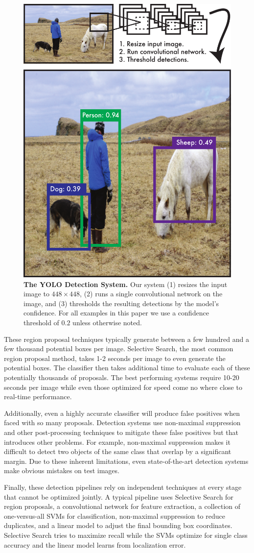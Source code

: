 \documentclass{article} %
\begin{document}
\begin{figure}[t]
\begin{center}
        \includegraphics[width=.4\linewidth]{system}
\end{center}
   \caption{\textbf{The YOLO Detection System.} Our system (1) resizes the input image to $448 \times 448$, (2) runs a single convolutional network on the image, and (3) thresholds the resulting detections by the model's confidence. For all examples in this paper we use a confidence threshold of $0.2$ unless otherwise noted.}
\label{system}
\end{figure}

These region proposal techniques typically generate between a few hundred and a few thousand potential boxes per image. Selective Search, the most common region proposal method, takes 1-2 seconds per image to even generate the potential boxes. The classifier then takes additional time to evaluate each of these potentially thousands of proposals. The best performing systems require 10-20 seconds per image while even those optimized for speed come no where close to real-time performance.

Additionally, even a highly accurate classifier will produce false positives when faced with so many proposals. Detection systems use non-maximal suppression and other post-processing techniques to mitigate these false positives but that introduces other problems. For example, non-maximal suppression makes it difficult to detect two objects of the same class that overlap by a significant margin. Due to these inherent limitations, even state-of-the-art detection systems make obvious mistakes on test images.

Finally, these detection pipelines rely on independent techniques at every stage that cannot be optimized jointly. A typical pipeline uses Selective Search for region proposals, a convolutional network for feature extraction, a collection of one-versus-all SVMs for classification, non-maximal suppression to reduce duplicates, and a linear model to adjust the final bounding box coordinates. Selective Search tries to maximize recall while the SVMs optimize for single class accuracy and the linear model learns from localization error.
\end{document}
